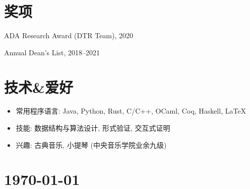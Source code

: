 \documentclass{article}
\begin{document}












\section*{奖项}
ADA Research Award (DTR Team), 2020

Annual Dean's List, 2018--2021

\section*{技术\&爱好}
\begin{itemize}
    \setlength{\itemsep}{1pt}
    \setlength{\parskip}{0pt}
    \setlength{\parsep}{0pt}
    \item 常用程序语言: Java, Python, Rust, C/C++, OCaml, Coq, Haskell, \LaTeX
    \item 技能: 数据结构与算法设计, 形式验证, 交互式证明
    \item 兴趣: 古典音乐, 小提琴 (中央音乐学院业余九级)
\end{itemize}





\vfill

\section*{\hfill\color{OliveGreen}\today}
\end{document}
